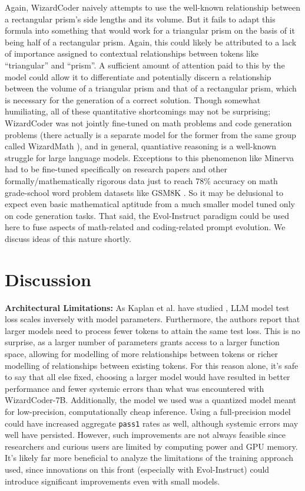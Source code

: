 \documentclass[10pt]{article}
\newcommand{\code}[1]{\texttt{#1}}
\theoremstyle{definition}
\begin{document}
Again, WizardCoder naively attempts to use the well-known relationship between a rectangular prism's side lengths and its volume. But it fails to adapt this formula into something that would work for a triangular prism on the basis of it being half of a rectangular prism. Again, this could likely be attributed to a lack of importance assigned to contextual relationships between tokens like   ``triangular'' and ``prism''. A sufficient amount of attention paid to this by the model could allow it to differentiate and potentially discern a relationship between the volume of a triangular prism and that of a rectangular prism, which is necessary for the generation of a correct solution. Though somewhat humiliating, all of these quantitative shortcomings may not be surprising; WizardCoder was not jointly fine-tuned on math problems and code generation problems (there actually is a separate model for the former from the same group called WizardMath \cite{wizardmath}), and in general, quantiative reasoning is a well-known struggle for large language models. Exceptions to this phenomenon like Minerva \cite{googlequantreasoning} had to be fine-tuned specifically on research papers and other formally/mathematically rigorous data just to reach 78\% accuracy on math grade-school word problem datasets like GSM8K \cite{mathtraining}. So it may be delusional to expect even basic mathematical aptitude from a much smaller model tuned only on code generation tasks. That said, the Evol-Instruct paradigm could be used here to fuse aspects of math-related and coding-related prompt evolution. We discuss ideas of this nature shortly.

\section{Discussion}
\noindent\textbf{Architectural Limitations:} As Kaplan et al. have studied \cite{kaplanscaling}, LLM model test loss scales inversely with model parameters. Furthermore, the authors report that larger models need to process fewer tokens to attain the same test loss. This is no surprise, as a larger number of parameters grants access to a larger function space, allowing for modelling of more relationships between tokens or richer modelling of relationships between existing tokens. For this reason alone, it's safe to say that all else fixed, choosing a larger model would have resulted in better performance and fewer systemic errors than what was encountered with WizardCoder-7B. Additionally, the model we used was a quantized model meant for low-precision, computationally cheap inference. Using a full-precision model could have increased aggregate \code{pass1} rates as well, although systemic errors may well have persisted. However, such improvements are not always feasible since researchers and curious users are limited by computing power and GPU memory. It's likely far more beneficial to analyze the limitations of the training approach used, since innovations on this front (especially with Evol-Instruct) could introduce significant improvements even with small models.\\
\end{document}
